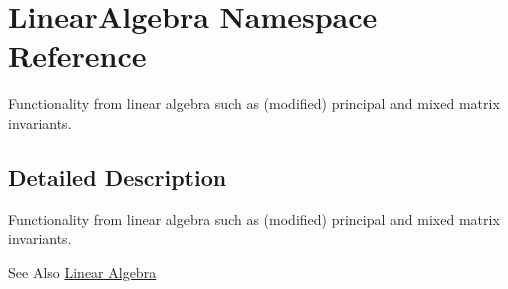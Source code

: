 \hypertarget{namespaceLinearAlgebra}{\section{Linear\-Algebra Namespace Reference}
\label{namespaceLinearAlgebra}
}


Functionality from linear algebra such as (modified) principal and mixed matrix invariants.  




\subsection{Detailed Description}
Functionality from linear algebra such as (modified) principal and mixed matrix invariants. \begin{DoxySeeAlso}{See Also}
\hyperlink{group__LinearAlgebraGroup}{Linear Algebra} 
\end{DoxySeeAlso}
